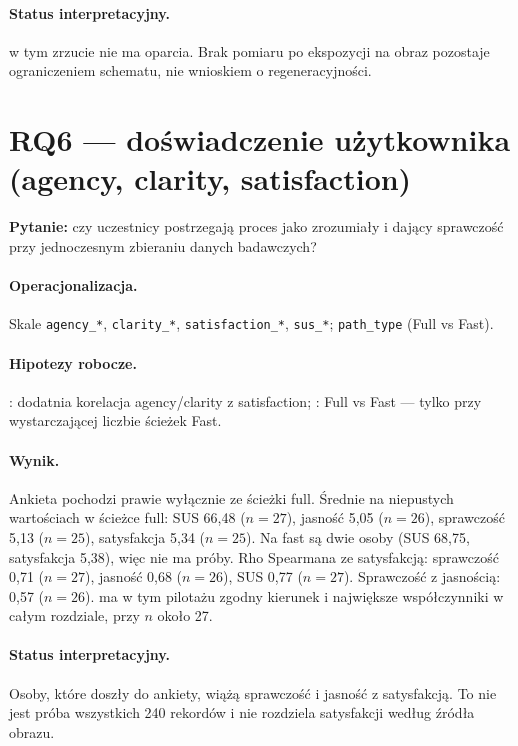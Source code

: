 \paragraph{Status interpretacyjny.}
 w tym zrzucie nie ma oparcia. Brak pomiaru po ekspozycji na obraz pozostaje ograniczeniem schematu, nie wnioskiem o regeneracyjności.

\section{RQ6 --- doświadczenie użytkownika (agency, clarity, satisfaction)}
\label{ch08:sec:rq6}

\textbf{Pytanie:} czy uczestnicy postrzegają proces jako zrozumiały i dający sprawczość przy jednoczesnym zbieraniu danych badawczych?

\paragraph{Operacjonalizacja.}
Skale \texttt{agency\_*}, \texttt{clarity\_*}, \texttt{satisfaction\_*}, \texttt{sus\_*}; \texttt{path\_type} (Full vs Fast).

\paragraph{Hipotezy robocze.}
: dodatnia korelacja agency/clarity z satisfaction; : Full vs Fast --- tylko przy wystarczającej liczbie ścieżek Fast.

\paragraph{Wynik.}
Ankieta pochodzi prawie wyłącznie ze ścieżki full. Średnie na niepustych wartościach w ścieżce full: SUS 66,48 ($n=27$), jasność 5,05 ($n=26$), sprawczość 5,13 ($n=25$), satysfakcja 5,34 ($n=25$). Na fast są dwie osoby (SUS 68,75, satysfakcja 5,38), więc  nie ma próby.
Rho Spearmana ze satysfakcją: sprawczość 0,71 ($n=27$), jasność 0,68 ($n=26$), SUS 0,77 ($n=27$). Sprawczość z jasnością: 0,57 ($n=26$).  ma w tym pilotażu zgodny kierunek i największe współczynniki w całym rozdziale, przy $n$ około 27.

\paragraph{Status interpretacyjny.}
Osoby, które doszły do ankiety, wiążą sprawczość i jasność z satysfakcją. To nie jest próba wszystkich 240 rekordów i nie rozdziela satysfakcji według źródła obrazu.

